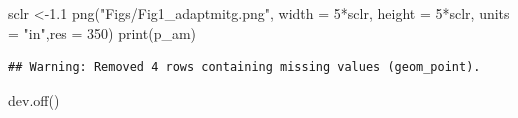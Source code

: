 \documentclass[
]{article}
\newenvironment{Shaded}{\begin{snugshade}}{\end{snugshade}}
\newcommand{\AttributeTok}[1]{\textcolor[rgb]{0.77,0.63,0.00}{#1}}
\newcommand{\DecValTok}[1]{\textcolor[rgb]{0.00,0.00,0.81}{#1}}
\newcommand{\FloatTok}[1]{\textcolor[rgb]{0.00,0.00,0.81}{#1}}
\newcommand{\FunctionTok}[1]{\textcolor[rgb]{0.00,0.00,0.00}{#1}}
\newcommand{\NormalTok}[1]{#1}
\newcommand{\OtherTok}[1]{\textcolor[rgb]{0.56,0.35,0.01}{#1}}
\newcommand{\SpecialCharTok}[1]{\textcolor[rgb]{0.00,0.00,0.00}{#1}}
\newcommand{\StringTok}[1]{\textcolor[rgb]{0.31,0.60,0.02}{#1}}
\begin{document}
\begin{Shaded}
\begin{Highlighting}[]
\NormalTok{    sclr }\OtherTok{\textless{}{-}}\FloatTok{1.1}
    \FunctionTok{png}\NormalTok{(}\StringTok{"Figs/Fig1\_adaptmitg.png"}\NormalTok{, }
        \AttributeTok{width =} \DecValTok{5}\SpecialCharTok{*}\NormalTok{sclr, }\AttributeTok{height =} \DecValTok{5}\SpecialCharTok{*}\NormalTok{sclr, }\AttributeTok{units =} \StringTok{"in"}\NormalTok{,}\AttributeTok{res =} \DecValTok{350}\NormalTok{)}
    \FunctionTok{print}\NormalTok{(p\_am)}
\end{Highlighting}
\end{Shaded}

\begin{verbatim}
## Warning: Removed 4 rows containing missing values (geom_point).
\end{verbatim}

\begin{Shaded}
\begin{Highlighting}[]
    \FunctionTok{dev.off}\NormalTok{()}
    

\end{Highlighting}
\end{Shaded}
\end{document}
